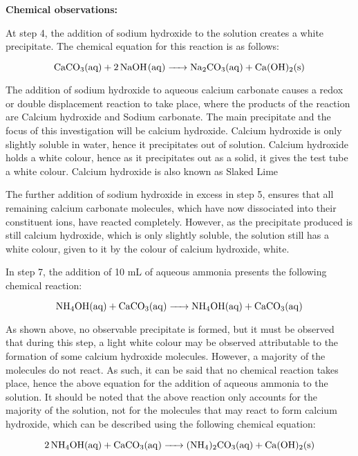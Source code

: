 \documentclass[11pt, a4]{article}
\begin{document}
			\noindent \textbf{Chemical observations:}

				At step 4, the addition of sodium hydroxide to the solution creates a white precipitate. The chemical equation for this reaction is as follows:

				\begin{equation}
					\ce{CaCO_3{(aq)} + 2NaOH(aq) -> Na_2CO_3(aq) + Ca(OH)_2(s)}
				\end{equation}
				
				The addition of sodium hydroxide to aqueous calcium carbonate causes a redox or double displacement reaction to take place, where the products of the reaction are Calcium hydroxide and Sodium carbonate. The main precipitate and the focus of this investigation will be calcium hydroxide. Calcium hydroxide is only slightly soluble in water, hence it precipitates out of solution. Calcium hydroxide holds a white colour, hence as it precipitates out as a solid, it gives the test tube a white colour. Calcium hydroxide is also known as Slaked Lime

				The further addition of sodium hydroxide in excess in step 5, ensures that all remaining calcium carbonate molecules, which have now dissociated into their constituent ions, have reacted completely. However, as the precipitate produced is still calcium hydroxide, which is only slightly soluble, the solution still has a white colour, given to it by the colour of calcium hydroxide, white.

				In step 7, the addition of 10 mL of aqueous ammonia presents the following chemical reaction:

				\begin{equation}
					\ce{NH_4OH{(aq)} + CaCO_3(aq) -> NH_4OH{(aq)} + CaCO_3(aq)}
				\end{equation}

				As shown above, no observable precipitate is formed, but it must be observed that during this step, a light white colour may be observed attributable to the formation of some calcium hydroxide molecules. However, a majority of the molecules do not react. As such, it can be said that no chemical reaction takes place, hence the above equation for the addition of aqueous ammonia to the solution. It should be noted that the above reaction only accounts for the majority of the solution, not for the molecules that may react to form calcium hydroxide, which can be described using the following chemical equation:

				\begin{equation}
					\ce{2NH_4OH{(aq)} + CaCO_3(aq) -> (NH_4)_2CO_3{(aq)} + Ca(OH)_2(s)}
				\end{equation}
\end{document}
